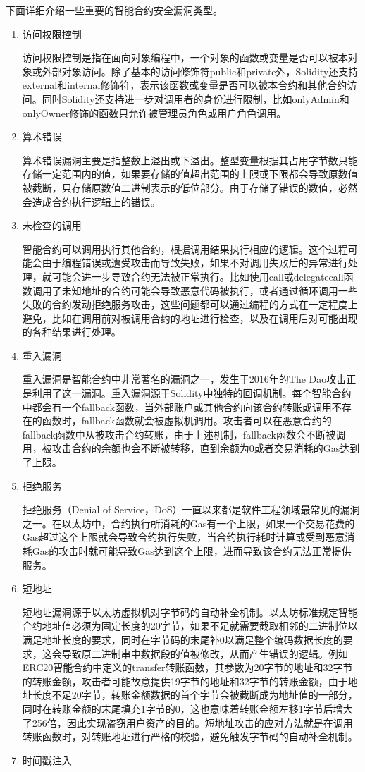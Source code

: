 下面详细介绍一些重要的智能合约安全漏洞类型。
\begin{enumerate}[label=\Alph*., align=left, leftmargin=*]
    \item 访问权限控制
    
    访问权限控制是指在面向对象编程中，一个对象的函数或变量是否可以被本对象或外部对象访问。除了基本的访问修饰符public和private外，Solidity还支持external和internal修饰符，表示该函数或变量是否可以被本合约和其他合约访问。同时Solidity还支持进一步对调用者的身份进行限制，比如onlyAdmin和onlyOwner修饰的函数只允许被管理员角色或用户角色调用。
    \item 算术错误
    
    算术错误漏洞主要是指整数上溢出或下溢出。整型变量根据其占用字节数只能存储一定范围内的值，如果要存储的值超出范围的上限或下限都会导致原数值被截断，只存储原数值二进制表示的低位部分。由于存储了错误的数值，必然会造成合约执行逻辑上的错误。
    \item 未检查的调用
    
    智能合约可以调用执行其他合约，根据调用结果执行相应的逻辑。这个过程可能会由于编程错误或遭受攻击而导致失败，如果不对调用失败后的异常进行处理，就可能会进一步导致合约无法被正常执行。比如使用call或delegatecall函数调用了未知地址的合约可能会导致恶意代码被执行，或者通过循环调用一些失败的合约发动拒绝服务攻击，这些问题都可以通过编程的方式在一定程度上避免，比如在调用前对被调用合约的地址进行检查，以及在调用后对可能出现的各种结果进行处理。
    \item 重入漏洞
    
    重入漏洞是智能合约中非常著名的漏洞之一，发生于2016年的The Dao攻击正是利用了这一漏洞。重入漏洞源于Solidity中独特的回调机制。每个智能合约中都会有一个fallback函数，当外部账户或其他合约向该合约转账或调用不存在的函数时，fallback函数就会被虚拟机调用。攻击者可以在恶意合约的fallback函数中从被攻击合约转账，由于上述机制，fallback函数会不断被调用，被攻击合约的余额也会不断被转移，直到余额为0或者交易消耗的Gas达到了上限。
    \item 拒绝服务
    
    拒绝服务（Denial of Service，DoS）一直以来都是软件工程领域最常见的漏洞之一。在以太坊中，合约执行所消耗的Gas有一个上限，如果一个交易花费的Gas超过这个上限就会导致合约执行失败，当合约执行耗时计算或受到恶意消耗Gas的攻击时就可能导致Gas达到这个上限，进而导致该合约无法正常提供服务。
    \item 短地址
    
    短地址漏洞源于以太坊虚拟机对字节码的自动补全机制。以太坊标准规定智能合约地址值必须为固定长度的20字节，如果不足就需要截取相邻的二进制位以满足地址长度的要求，同时在字节码的末尾补0以满足整个编码数据长度的要求，这会导致原二进制串中数据段的值被修改，从而产生错误的逻辑。例如ERC20智能合约中定义的transfer转账函数，其参数为20字节的地址和32字节的转账金额，攻击者可能故意提供19字节的地址和32字节的转账金额，由于地址长度不足20字节，转账金额数据的首个字节会被截断成为地址值的一部分，同时在转账金额的末尾填充1字节的0，这也意味着转账金额左移1字节后增大了256倍，因此实现盗窃用户资产的目的。短地址攻击的应对方法就是在调用转账函数时，对转账地址进行严格的校验，避免触发字节码的自动补全机制。
    \item 时间戳注入
    

\end{enumerate}
